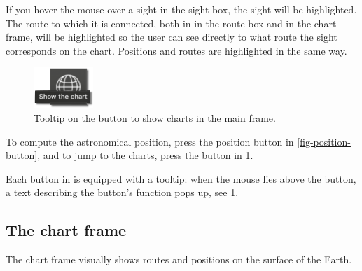 \documentclass{ol-softwaremanual}
\begin{document}
If you hover the mouse over a \gls{sight} in the \gls{sight} box, the \gls{sight} will be highlighted. The \gls{route} to which it is connected, both in in the \gls{route} box and in the chart frame, will be highlighted so the user can see directly to what \gls{route} the \gls{sight} corresponds on the chart. Positions and \glspl{route} are highlighted in the same way. 

\begin{figure}
  \includegraphics[width=0.2\textwidth]{figures/tooltip.png}
  \caption{\label{fig-tooltip} Tooltip on the button to show charts in the main frame.}
\end{figure}



To compute the astronomical \gls{position}, press the position button in \cref{fig-position-button}, and to jump to the charts, press the button in \cref{fig-tooltip}. 


Each button in \thel is equipped with a tooltip: when the mouse lies above the button, a text describing the button's function pops up, see \cref{fig-tooltip}. 




\subsection{The chart frame}\label{section-chart-frame}

The chart frame visually shows  \glspl{route} and \glspl{position} on the surface of the Earth. 
\end{document}

